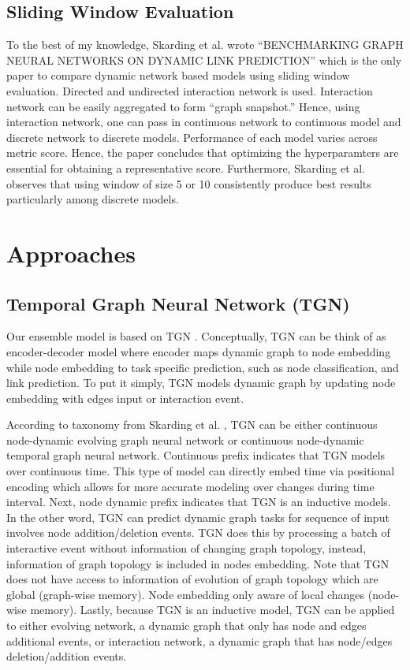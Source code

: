 \documentclass{IEEEtran}
\begin{document}
\subsection{Sliding Window Evaluation}
\label{sec:orga5ce1ab}
To the best of my knowledge, Skarding et al. wrote ``BENCHMARKING GRAPH NEURAL NETWORKS ON DYNAMIC LINK PREDICTION'' \cite{skarding2021benchmarking} which is the only paper to compare dynamic network based models using sliding window evaluation. Directed and undirected interaction network is used. Interaction network can be easily aggregated to form ``graph snapshot.'' Hence, using interaction network, one can pass in continuous network to continuous model and discrete network to discrete models. Performance of each model varies across metric score. Hence, the paper concludes that optimizing the hyperparamters are essential for obtaining a representative score. Furthermore, Skarding et al. observes that using window of size 5 or 10 consistently produce best results particularly among discrete models.

\section{Approaches}
\label{sec:org00c8d4c}
\subsection{Temporal Graph Neural Network (TGN)}
\label{sec:orgfa3200a}

Our ensemble model is based on TGN \cite{rossi2020temporal}. Conceptually, TGN can be think of as encoder-decoder model where encoder maps dynamic graph to node embedding while node embedding to task specific prediction, such as node classification, and link prediction. To put it simply, TGN models dynamic graph by updating node embedding with edges input or interaction event.

According to taxonomy from Skarding et al. \cite{skardingFoundationsModelingDynamic2021}, TGN can be either continuous node-dynamic evolving graph neural network or continuous node-dynamic temporal graph neural network. Continuous prefix indicates that TGN models over continuous time. This type of model can directly embed time via positional encoding which allows for more accurate modeling over changes during time interval. Next, node dynamic prefix indicates that TGN is an inductive models. In the other word, TGN can predict dynamic graph tasks for sequence of input involves node addition/deletion events. TGN does this by processing a batch of interactive event without information of changing graph topology, instead, information of graph topology is included in nodes embedding. Note that TGN does not have access to information of evolution of graph topology which are global (graph-wise memory). Node embedding only aware of local changes (node-wise memory). Lastly, because TGN is an inductive model, TGN can be applied to either evolving network, a dynamic graph that only has node and edges additional events, or interaction network, a dynamic graph that has node/edges deletion/addition events.
\end{document}
